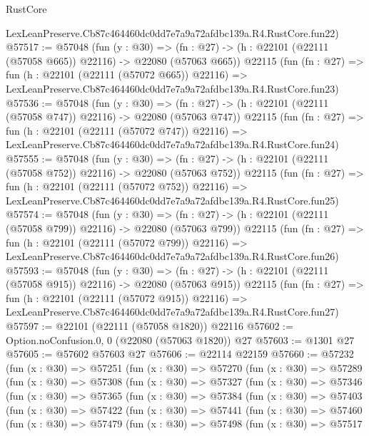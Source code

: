 \begin{lexlean}{RustCore}
\begin{coremodule}
    LexLeanPreserve.Cb87c464460dc0dd7e7a9a72afdbc139a.R4.RustCore.fun22)
@57517 := @57048
    (fun (y : @30) =>
    (fn : @27) -> (h : @22101 (@22111 (@57058 @665)) @22116) -> @22080 (@57063 @665))
    @22115
    (fun (fn : @27) =>
    fun (h : @22101 (@22111 (@57072 @665)) @22116) =>
    LexLeanPreserve.Cb87c464460dc0dd7e7a9a72afdbc139a.R4.RustCore.fun23)
@57536 := @57048
    (fun (y : @30) =>
    (fn : @27) -> (h : @22101 (@22111 (@57058 @747)) @22116) -> @22080 (@57063 @747))
    @22115
    (fun (fn : @27) =>
    fun (h : @22101 (@22111 (@57072 @747)) @22116) =>
    LexLeanPreserve.Cb87c464460dc0dd7e7a9a72afdbc139a.R4.RustCore.fun24)
@57555 := @57048
    (fun (y : @30) =>
    (fn : @27) -> (h : @22101 (@22111 (@57058 @752)) @22116) -> @22080 (@57063 @752))
    @22115
    (fun (fn : @27) =>
    fun (h : @22101 (@22111 (@57072 @752)) @22116) =>
    LexLeanPreserve.Cb87c464460dc0dd7e7a9a72afdbc139a.R4.RustCore.fun25)
@57574 := @57048
    (fun (y : @30) =>
    (fn : @27) -> (h : @22101 (@22111 (@57058 @799)) @22116) -> @22080 (@57063 @799))
    @22115
    (fun (fn : @27) =>
    fun (h : @22101 (@22111 (@57072 @799)) @22116) =>
    LexLeanPreserve.Cb87c464460dc0dd7e7a9a72afdbc139a.R4.RustCore.fun26)
@57593 := @57048
    (fun (y : @30) =>
    (fn : @27) -> (h : @22101 (@22111 (@57058 @915)) @22116) -> @22080 (@57063 @915))
    @22115
    (fun (fn : @27) =>
    fun (h : @22101 (@22111 (@57072 @915)) @22116) =>
    LexLeanPreserve.Cb87c464460dc0dd7e7a9a72afdbc139a.R4.RustCore.fun27)
@57597 := @22101 (@22111 (@57058 @1820)) @22116
@57602 := Option.noConfusion.{0, 0} (@22080 (@57063 @1820)) @27
@57603 := @1301 @27
@57605 := @57602 @57603 @27
@57606 := @22114 @22159
@57660 := @57232
    (fun (x : @30) =>
    @57251
      (fun (x : @30) =>
      @57270
        (fun (x : @30) =>
        @57289
          (fun (x : @30) =>
          @57308
            (fun (x : @30) =>
            @57327
              (fun (x : @30) =>
              @57346
                (fun (x : @30) =>
                @57365
                  (fun (x : @30) =>
                  @57384
                    (fun (x : @30) =>
                    @57403
                      (fun (x : @30) =>
                      @57422
                        (fun (x : @30) =>
                        @57441
                          (fun (x : @30) =>
                          @57460
                            (fun (x : @30) =>
                            @57479
                              (fun (x : @30) =>
                              @57498
                                (fun (x : @30) =>
                                @57517

\end{coremodule}
\end{lexlean}
